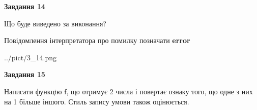 \documentclass[11pt, ukrainian]{article}
\begin{document}
{\begin {large}
{\begin {center}\textbf{Завдання 14}\end {center}}\par
Що буде виведено за виконання? \par
Повідомлення інтерпретатора про помилку позначати \textbf{error}

\begin{center}
	{../pict/3_14.png}
\end{center}
\newpage

{\begin {center}\textbf{Завдання 15}\end {center}}\par

Написати функцiю f, що отримує 2 числа і повертає ознаку того, що одне з них на 1 більше іншого. Стиль запису умови також оцінюється.\par
\newpage

\end {large}}
\end{document}
